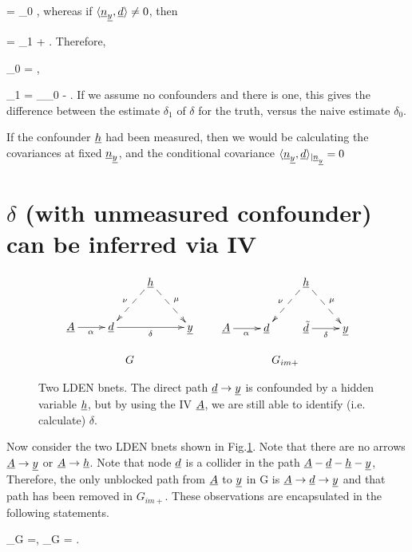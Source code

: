 \beq
\av{\rvy, \rvd} = \delta_0 \av{\rvd, \rvd}
\;,
\eeq
whereas if
$\langle{\underline{n}}_{\underline{y}}, {\underline{d}}\rangle\neq 0$, then

\beq
\av{\rvy, \rvd} = \delta_1 \av{\rvd, \rvd}
+ \av{\rvn_\rvy, \rvd}
\;.
\eeq
Therefore,


\beq
\delta_0 = \frac{\av{\rvy, \rvd}}{\av{\rvd, \rvd}}
\;,
\eeq

\beq
\delta_1 =
\underbrace{\frac{\av{\rvy, \rvd}}{\av{\rvd, \rvd}}}_{\delta_0}
-
\frac{\av{\rvn_\rvy, \rvd}}{\av{\rvd, \rvd}}
\;.
\eeq  
If we assume no confounders
and there is one, this gives the difference
between the estimate $\delta_1$ of $\delta$ for
the truth, versus
the naive estimate $\delta_0$.

If the confounder ${\underline{h}}$
had been measured, then
we would be calculating 
the covariances at fixed ${\underline{n}}_{\underline{y}}$,
and 
the conditional covariance $\langle{\underline{n}}_{\underline{y}}, {\underline{d}}\rangle_{|{\underline{n}}_{\underline{y}}}=0$

\section*{$\delta$
(with unmeasured confounder)
can be
inferred via IV}



\begin{figure}[h!]
$$
\begin{array}{ccc}
\xymatrix{
&&\rvh\ar@{-->}[dl]_\nu\ar@{-->}[dr]^\mu
\\
\rvA\ar[r]_\alpha
&\rvd\ar[rr]_\delta
&&\rvy
}
&&
\xymatrix{
&&\rvh\ar@{-->}[dl]_\nu\ar@{-->}[dr]^\mu
\\
\rvA\ar[r]_\alpha
&\rvd&
\rvtd\ar[r]_\delta
&\rvy}
\\
\\
G&&G_{im+}
\end{array}
$$
\caption{
Two LDEN bnets. The direct path ${\underline{d}}\rightarrow{\underline{y}}$
is confounded by
a hidden variable ${\underline{h}}$, but
by using the IV ${\underline{A}}$, we are still
able to 
identify (i.e. calculate)
$\delta$.
}
\label{fig-iv-G-im}
\end{figure}

Now consider the two LDEN bnets 
shown in Fig.\ref{fig-iv-G-im}.
Note that there are no arrows
${\underline{A}}\rightarrow{\underline{y}}$
or 
${\underline{A}}\rightarrow{\underline{h}}$. Note that
node ${\underline{d}}$ is a collider
in the path 
${\underline{A}}-{\underline{d}}-{\underline{h}}-{\underline{y}}$, 
Therefore,
the only unblocked path
from ${\underline{A}}$ to 
${\underline{y}}$ in G 
is ${\underline{A}}\rightarrow{\underline{d}}\rightarrow{\underline{y}}$
and that path has been
removed in $G_{im+}$. These
observations are 
encapsulated in the following statements.

\beq
\rvd\perp_{G} \rvy =, 
\;\; \rvA\perp_{G} \rvy= 
\;.
\eeq

